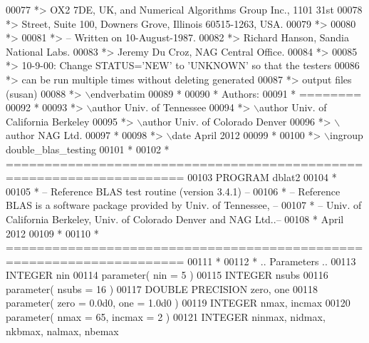 \begin{DoxyCode}
00077 \textcolor{comment}{*>       OX2 7DE, UK,  and  Numerical Algorithms Group Inc.,  1101  31st}
00078 \textcolor{comment}{*>       Street,  Suite 100,  Downers Grove,  Illinois 60515-1263,  USA.}
00079 \textcolor{comment}{*>}
00080 \textcolor{comment}{*>}
00081 \textcolor{comment}{*> -- Written on 10-August-1987.}
00082 \textcolor{comment}{*>    Richard Hanson, Sandia National Labs.}
00083 \textcolor{comment}{*>    Jeremy Du Croz, NAG Central Office.}
00084 \textcolor{comment}{*>}
00085 \textcolor{comment}{*>    10-9-00:  Change STATUS='NEW' to 'UNKNOWN' so that the testers}
00086 \textcolor{comment}{*>              can be run multiple times without deleting generated}
00087 \textcolor{comment}{*>              output files (susan)}
00088 \textcolor{comment}{*> \(\backslash\)endverbatim}
00089 \textcolor{comment}{*}
00090 \textcolor{comment}{*  Authors:}
00091 \textcolor{comment}{*  ========}
00092 \textcolor{comment}{*}
00093 \textcolor{comment}{*> \(\backslash\)author Univ. of Tennessee }
00094 \textcolor{comment}{*> \(\backslash\)author Univ. of California Berkeley }
00095 \textcolor{comment}{*> \(\backslash\)author Univ. of Colorado Denver }
00096 \textcolor{comment}{*> \(\backslash\)author NAG Ltd. }
00097 \textcolor{comment}{*}
00098 \textcolor{comment}{*> \(\backslash\)date April 2012}
00099 \textcolor{comment}{*}
00100 \textcolor{comment}{*> \(\backslash\)ingroup double\_blas\_testing}
00101 \textcolor{comment}{*}
00102 \textcolor{comment}{*  =====================================================================}
00103       \textcolor{keyword}{PROGRAM} dblat2
00104 \textcolor{comment}{*}
00105 \textcolor{comment}{*  -- Reference BLAS test routine (version 3.4.1) --}
00106 \textcolor{comment}{*  -- Reference BLAS is a software package provided by Univ. of Tennessee,    --}
00107 \textcolor{comment}{*  -- Univ. of California Berkeley, Univ. of Colorado Denver and NAG Ltd..--}
00108 \textcolor{comment}{*     April 2012}
00109 \textcolor{comment}{*}
00110 \textcolor{comment}{*  =====================================================================}
00111 \textcolor{comment}{*}
00112 \textcolor{comment}{*     .. Parameters ..}
00113       \textcolor{keywordtype}{INTEGER}            nin
00114       parameter( nin = 5 )
00115       \textcolor{keywordtype}{INTEGER}            nsubs
00116       parameter( nsubs = 16 )
00117       \textcolor{keywordtype}{DOUBLE PRECISION}   zero, one
00118       parameter( zero = 0.0d0, one = 1.0d0 )
00119       \textcolor{keywordtype}{INTEGER}            nmax, incmax
00120       parameter( nmax = 65, incmax = 2 )
00121       \textcolor{keywordtype}{INTEGER}            ninmax, nidmax, nkbmax, nalmax, nbemax

\end{DoxyCode}
